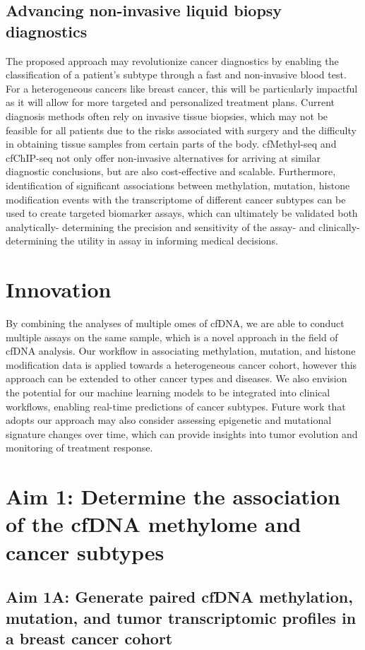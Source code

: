 \documentclass[11pt]{article}
\begin{document}
\subsection*{Advancing non-invasive liquid biopsy diagnostics} 
The proposed approach may revolutionize cancer diagnostics by enabling the
classification of a patient's subtype through a fast and non-invasive blood test.
For a heterogeneous cancers like breast cancer, this will be particularly impactful
as it will allow for more targeted and personalized treatment plans. 
Current diagnosis methods often rely on invasive tissue biopsies, 
which may not be feasible for all patients due to the risks associated with
surgery and the difficulty in obtaining tissue samples from certain parts of the body.
cfMethyl-seq and cfChIP-seq not only offer non-invasive alternatives for arriving
at similar diagnostic conclusions, but are also cost-effective and scalable.
Furthermore, identification of significant associations between methylation, mutation, histone modification events with the transcriptome of different cancer subtypes can be used to create targeted biomarker assays, which can ultimately be validated both analytically- determining the precision and sensitivity of the assay- and clinically- determining the utility in assay in informing medical decisions.
\section*{Innovation}
By combining the analyses of multiple omes of cfDNA, we are able to conduct
multiple assays on the same sample, which is a novel approach in the field of
cfDNA analysis. Our workflow in associating methylation, mutation, and histone
modification data is applied towards a heterogeneous cancer cohort, however 
this approach can be extended to other cancer types and diseases. We also
envision the potential for our machine learning models to be integrated into
clinical workflows, enabling real-time predictions of cancer subtypes. 
Future work that adopts our approach may also consider assessing epigenetic
and mutational signature changes over time, which can provide insights into
tumor evolution and monitoring of treatment response.

\newpage
\section*{Aim 1: Determine the association of the cfDNA methylome and cancer subtypes}
\subsection*{Aim 1A: Generate paired cfDNA methylation, mutation, and tumor transcriptomic profiles in a breast cancer cohort}
\end{document}
